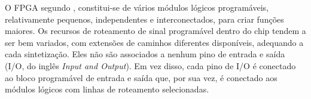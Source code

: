

      O FPGA segundo \cite{tocci2003sistemas}, constitui-se de vários módulos lógicos programáveis, relativamente pequenos, independentes e interconectados, para criar funções maiores.
      Os recursos de roteamento de sinal programável dentro do chip tendem a ser bem variados, com extensões de caminhos diferentes disponíveis, adequando a cada sintetização.
      Eles não são associados a nenhum pino de entrada e saída (I/O, do inglês \textit{Input and Output}).
      Em vez disso, cada pino de I/O é conectado ao bloco programável de entrada e saída que, por sua vez, é conectado aos módulos lógicos com linhas de roteamento selecionadas.

